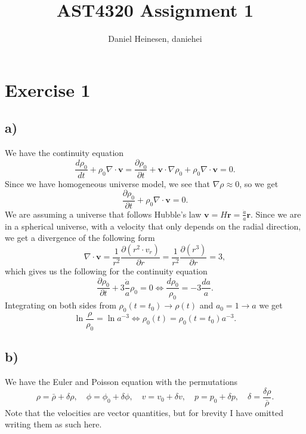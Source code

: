 \documentclass[a4paper,norsk, 10pt]{article}
\title{AST4320 Assignment 1}
\author{Daniel Heinesen, daniehei}
\begin{document}
\maketitle

\section{Exercise 1}
\subsection{a)}
We have the continuity equation
\begin{equation}
\frac{d\rho_0}{dt} + \rho_0 \nabla \cdot \mathbf{v} = \frac{\partial\rho_0}{\partial t} + \mathbf{v}\cdot \nabla \rho_0 + \rho_0 \nabla \cdot \mathbf{v} = 0.
\end{equation}
Since we have homogeneous universe model, we see that $\nabla \rho \approx 0$, so we get
\begin{equation}
\frac{\partial\rho_0}{\partial t} + \rho_0 \nabla \cdot \mathbf{v} = 0.
\end{equation}
We are assuming a universe that follows Hubble's law $\mathbf{v} = H\mathbf{r} = \frac{\dot{a}}{a}\mathbf{r}$. Since we are in a spherical universe, with a velocity that only depends on the radial direction, we get a divergence of the following form
\begin{equation}
\nabla \cdot \mathbf{v} = \frac{1}{r^2}\frac{\partial (r^2 \cdot v_r)}{\partial r} = \frac{1}{r^2}\frac{\partial (r^3)}{\partial r} = 3,
\end{equation}
which gives us the following for the continuity equation
\begin{equation}
\frac{\partial\rho_0}{\partial t} + 3\frac{\dot{a}}{a}\rho_0 = 0 \Leftrightarrow \frac{d\rho_0}{\rho_0} = -3 \frac{da}{a}.
\end{equation}
Integrating on both sides from $\rho_0(t=t_0) \rightarrow \rho(t)$ and $a_0 = 1 \rightarrow a$ we get
\begin{equation}
\ln \frac{\rho}{\rho_0} = \ln a^{-3} \Leftrightarrow \rho_0(t) = \rho_0(t=t_0)a^{-3}.
\end{equation}
\subsection{b)}
We have the Euler and Poisson equation with the permutations
\begin{equation}
\rho = \bar{\rho} + \delta \rho, \quad \phi = \phi_0 + \delta \phi, \quad v = v_0 + \delta v, \quad p = p_0 + \delta p, \quad \delta = \frac{\delta \rho}{\bar{\rho}}.
\end{equation}
Note that the velocities are vector quantities, but for brevity I have omitted writing them as such here.
\end{document}
